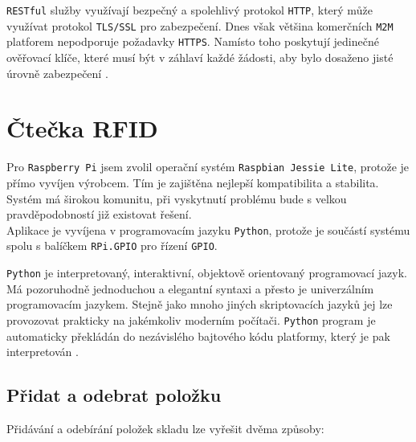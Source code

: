 \documentclass[czech,BP]{thesiskiv}
\begin{document}
		 \texttt{RESTful} služby využívají bezpečný a spolehlivý protokol \texttt{HTTP}, který může využívat protokol \texttt{TLS/SSL} pro zabezpečení. Dnes však většina komerčních \texttt{M2M} platforem nepodporuje požadavky \texttt{HTTPS}. Namísto toho poskytují jedinečné ověřovací klíče, které musí být v záhlaví každé žádosti, aby bylo dosaženo jisté úrovně zabezpečení \cite{karagiannis2015survey}.
		 
		 



		\section{Čtečka RFID}
			Pro \texttt{Raspberry Pi} jsem zvolil operační systém \texttt{Raspbian Jessie Lite}, protože je přímo vyvíjen výrobcem. Tím je zajištěna nejlepší kompatibilita a stabilita. 
			Systém má širokou komunitu, při vyskytnutí problému bude s velkou pravděpodobností již existovat řešení.\\
			Aplikace je vyvíjena v programovacím jazyku \texttt{Python}, protože je součástí systému spolu s balíčkem \texttt{RPi.GPIO} pro řízení \texttt{GPIO}.

			\texttt{Python} je interpretovaný, interaktivní, objektově orientovaný programovací jazyk. Má pozoruhodně jednoduchou a elegantní syntaxi a přesto je univerzálním programovacím jazykem. Stejně jako mnoho jiných skriptovacích jazyků jej lze provozovat prakticky na jakémkoliv moderním počítači. \texttt{Python} program je automaticky překládán do nezávislého bajtového kódu platformy, který je pak interpretován \cite{sanner1999python}.


		\subsection{Přidat a odebrat položku}
			Přidávání a odebírání položek skladu lze vyřešit dvěma způsoby:	
			
\end{document}
